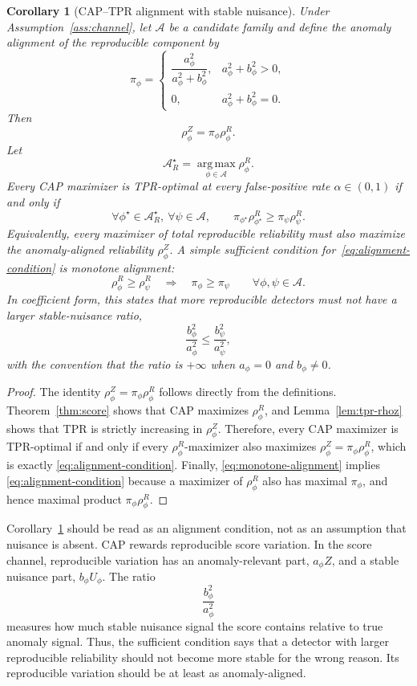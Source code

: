 \documentclass[11pt]{article}
\newtheorem{corollary}{Corollary}
\newcommand{\argmax}{\operatorname*{arg\,max}}
\begin{document}
\begin{corollary}[CAP--TPR alignment with stable nuisance]
\label{cor:cap-tpr-alignment}
Under Assumption~\ref{ass:channel}, let \(\mathcal A\) be a candidate family
and define the anomaly alignment of the reproducible component by
\[
    \pi_\phi
    =
    \begin{cases}
    \dfrac{a_\phi^2}{a_\phi^2+b_\phi^2},
        & a_\phi^2+b_\phi^2>0,\\[1.2ex]
    0,  & a_\phi^2+b_\phi^2=0.
    \end{cases}
\]
Then
\[
    \rho_\phi^Z=\pi_\phi\rho_\phi^R.
\]
Let
\[
    \mathcal A_R^\star
    =
    \argmax_{\phi\in\mathcal A}\rho_\phi^R .
\]
Every CAP maximizer is TPR-optimal at every false-positive rate
\(\alpha\in(0,1)\) if and only if
\[
    \forall \phi^\star\in\mathcal A_R^\star,\ \forall \psi\in\mathcal A,
    \qquad
    \pi_{\phi^\star}\rho_{\phi^\star}^R
    \ge
    \pi_\psi\rho_\psi^R .
    \tag{A}
    \label{eq:alignment-condition}
\]
Equivalently, every maximizer of total reproducible reliability must also
maximize the anomaly-aligned reliability \(\rho_\phi^Z\). A simple sufficient condition for~\eqref{eq:alignment-condition} is monotone
alignment:
\[
    \rho_\phi^R\ge \rho_\psi^R
    \quad\Longrightarrow\quad
    \pi_\phi\ge \pi_\psi
    \qquad
    \forall\phi,\psi\in\mathcal A.
    \tag{B}
    \label{eq:monotone-alignment}
\]
In coefficient form, this states that more reproducible detectors must not have a
larger stable-nuisance ratio,
\[
    \frac{b_\phi^2}{a_\phi^2}
    \le
    \frac{b_\psi^2}{a_\psi^2},
\]
with the convention that the ratio is \(+\infty\) when \(a_\phi=0\) and
\(b_\phi\ne0\).
\end{corollary}

\begin{proof}
The identity \(\rho_\phi^Z=\pi_\phi\rho_\phi^R\) follows directly from the
definitions. Theorem~\ref{thm:score} shows that CAP maximizes
\(\rho_\phi^R\), and Lemma~\ref{lem:tpr-rhoz} shows that TPR is strictly increasing
in \(\rho_\phi^Z\). Therefore, every CAP maximizer is TPR-optimal if and only if
every \(\rho_\phi^R\)-maximizer also maximizes
\(\rho_\phi^Z=\pi_\phi\rho_\phi^R\), which is exactly
\eqref{eq:alignment-condition}. Finally,
\eqref{eq:monotone-alignment} implies \eqref{eq:alignment-condition} because a
maximizer of \(\rho_\phi^R\) also has maximal \(\pi_\phi\), and hence maximal
product \(\pi_\phi\rho_\phi^R\).
\end{proof}

Corollary~\ref{cor:cap-tpr-alignment} should be read as an alignment condition,
not as an assumption that nuisance is absent. CAP rewards reproducible score
variation. In the score channel, reproducible variation has an anomaly-relevant
part, \(a_\phi Z\), and a stable nuisance part, \(b_\phi U_\phi\). The ratio
\[
    \frac{b_\phi^2}{a_\phi^2}
\]
measures how much stable nuisance signal the score contains relative to true
anomaly signal. Thus, the sufficient condition says that a detector with larger
reproducible reliability should not become more stable for the wrong reason. Its
reproducible variation should be at least as anomaly-aligned.
\end{document}
